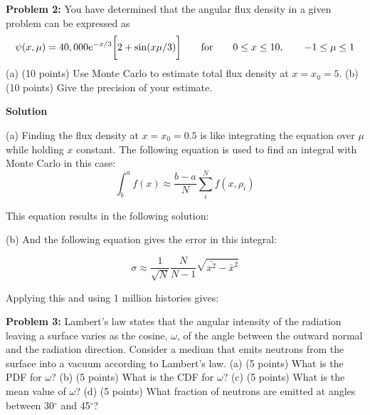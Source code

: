 \documentclass{amsart}
\theoremstyle{definition}
\begin{document}
\newpage
\textbf{Problem 2:} You have determined that the angular flux density in a given problem can be expressed as
\begin{equation*}
    \psi(x,\mu) = 40,000 e^{-x/3} \bigg[ 2+ \sin(x \mu/3) \bigg] \qquad \textnormal{for} \qquad 0 \leq x \leq 10, \qquad -1 \leq \mu \leq 1
\end{equation*}
(a) (10 points) Use Monte Carlo to estimate total flux density at $x=x_0=5$. \newline
(b) (10 points) Give the precision of your estimate.\newline
 
\textbf{Solution}

(a) Finding the flux density at $x=x_0=0.5$ is like integrating the equation over $\mu$ while holding $x$ constant.
The following equation is used to find an integral with Monte Carlo in this case:
$$ \int^a_b f(x) \approx \frac{b - a}{N} \sum^N_i f(x, \rho_i) $$

This equation results in the following solution: \\

(b)
And the following equation gives the error in this integral:

$$ \sigma \approx \frac{1}{\sqrt{N}} \frac{N}{N-1} \sqrt{\bar{x^2} - \bar{x}^2} $$

Applying this and using 1 million histories gives: \\


\newpage
\textbf{Problem 3:} Lambert's law states that the angular intensity of the radiation leaving a surface varies as the cosine, $\omega$, of the angle between the outward normal and the radiation direction. Consider a medium that emits neutrons from the surface into a vacuum according to Lambert's law. \newline
(a) (5 points) What is the PDF for $\omega$?\newline
(b) (5 points) What is the CDF for $\omega$?\newline
(c) (5 points) What is the mean value of $\omega$?\newline
(d) (5 points) What fraction of neutrons are emitted at angles between 30$^\circ$ and 45$^\circ$?\newline
 
\end{document}
